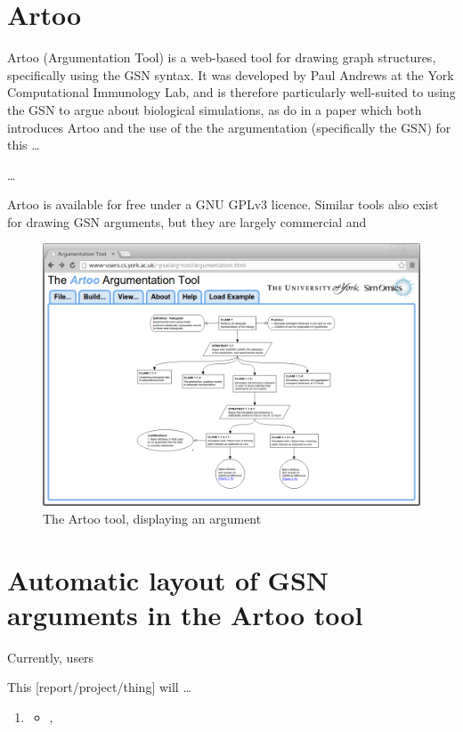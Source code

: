 \section{Artoo}

Artoo (Argumentation Tool) is a web-based tool for drawing graph structures, specifically using the GSN syntax. It was developed by Paul Andrews at the York Computational Immunology Lab, and is therefore particularly well-suited to using the GSN to argue about biological simulations,  as \citet*{royal} do in a paper which both introduces Artoo and the use of the the argumentation (specifically the GSN) for this \ldots {}

\ldots

Artoo is available for free under a GNU GPLv3 licence. Similar tools also exist for drawing GSN arguments, but they are largely commercial and 

\begin{figure}
  \centering
  \includegraphics[width=\textwidth]{graphics/artoo_screenshot.png}
  \caption{The Artoo tool, displaying an argument }
\end{figure}




\section{Automatic layout of GSN arguments in the Artoo tool}

Currently, users 

This [report/project/thing] will \ldots

  \begin{enumerate}
    \item
      \begin{itemize}
      \item ,
    \end{itemize}
  \end{enumerate}

